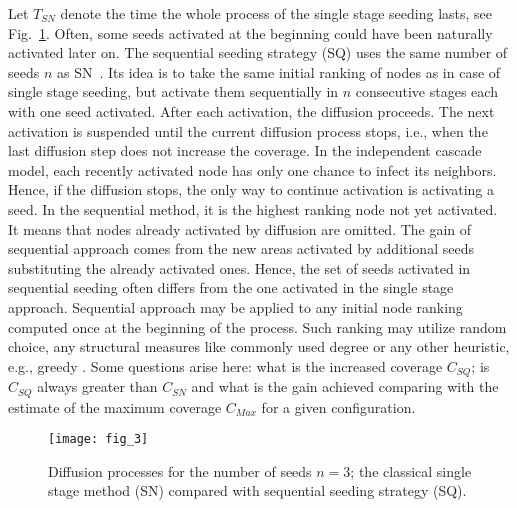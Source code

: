 \documentclass[11pt]{article} %
\begin{document}
Let $T_{SN}$ denote the time the whole process of the single stage seeding lasts, see Fig.~\ref{fig:SQ_SN_comp}. Often, some seeds activated at the beginning could have been naturally activated later on. The sequential seeding strategy (SQ) uses the same number of seeds $n$ as SN~\cite{jankowski2017balancing}. Its idea is to take the same initial ranking of nodes as in case of single stage seeding, but activate them sequentially in $n$ consecutive stages each with one seed activated. After each activation, the diffusion proceeds. The next activation is suspended until the current diffusion process stops, i.e., when the last diffusion step does not increase the coverage. In the independent cascade model, each recently activated node has only one chance to infect its neighbors. Hence, if the diffusion stops, the only way to continue activation is activating a seed. In the sequential method, it is the highest ranking node not yet activated. It means that nodes already activated by diffusion are omitted. The gain of sequential approach comes from the new areas activated by additional seeds substituting the already activated ones. Hence, the set of seeds activated in sequential seeding often differs from the one activated in the single stage approach. Sequential approach may be applied to any initial node ranking computed once at the beginning of the process. Such ranking may utilize random choice, any structural measures like commonly used degree or any other heuristic, e.g., greedy \cite{Kempe:2003, kempe2015}. Some questions arise here: what is the increased coverage $C_{SQ}$; is $C_{SQ}$ always greater than $C_{SN}$ and what is the gain achieved comparing with the estimate of the maximum coverage $C_{Max}$ for a given configuration. 

\begin{figure}%
\centering
\texttt{[image: fig\_3]}
\caption{Diffusion processes for the number of seeds $n=3$; the classical single stage method (SN) compared with sequential seeding strategy (SQ).}
\label{fig:SQ_SN_comp}
\end{figure}
\end{document}
